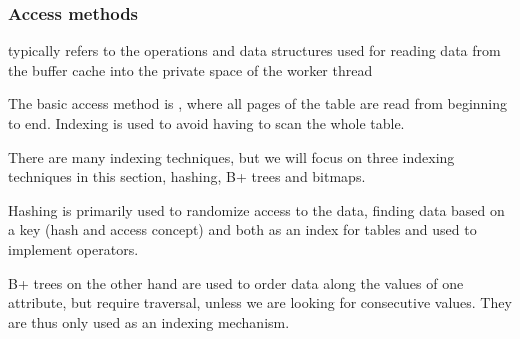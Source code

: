 \subsubsection{Access methods}
 typically refers to the operations and data structures used for reading data from the buffer cache into the private space of the worker thread

The basic access method is , where all pages of the table are read from beginning to end.
Indexing is used to avoid having to scan the whole table.

There are many indexing techniques, but we will focus on three indexing techniques in this section, hashing, B+ trees and bitmaps.

Hashing is primarily used to randomize access to the data, finding data based on a key (hash and access concept)
and both as an index for tables and used to implement operators.

B+ trees on the other hand are used to order data along the values of one attribute, but require traversal, unless we are looking for consecutive values.
They are thus only used as an indexing mechanism.
